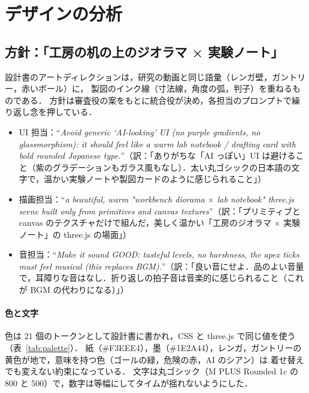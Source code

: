 \documentclass[a4paper,10pt]{ltjsarticle}
\newcommand{\tabref}[1]{表~\ref{#1}}
\begin{document}
\section{デザインの分析}
\label{sec:design}

\subsection{方針：「工房の机の上のジオラマ × 実験ノート」}
設計書のアートディレクションは，研究の動画と同じ語彙（レンガ壁，ガントリー，赤いボール）に，
製図のインク線（寸法線，角度の弧，判子）を重ねるものである．
方針は審査役の案をもとに統合役が決め，各担当のプロンプトで繰り返し念を押している．
\begin{itemize}
  \item UI 担当：``\textit{Avoid generic `AI-looking' UI (no purple gradients, no glassmorphism): it should feel like a warm lab notebook / drafting card with bold rounded Japanese type.}''（訳：「ありがちな「AI っぽい」UI は避けること（紫のグラデーションもガラス風もなし）．太い丸ゴシックの日本語の文字で，温かい実験ノートや製図カードのように感じられること」）
  \item 描画担当：``\textit{a beautiful, warm "workbench diorama $\times$ lab notebook" three.js scene built only from primitives and canvas textures}''（訳：「プリミティブと canvas のテクスチャだけで組んだ，美しく温かい「工房のジオラマ × 実験ノート」の three.js の場面」）
  \item 音担当：``\textit{Make it sound GOOD: tasteful levels, no harshness, the apex ticks must feel musical (this replaces BGM).}''（訳：「良い音にせよ．品のよい音量で，耳障りな音はなし．折り返しの拍子音は音楽的に感じられること（これが BGM の代わりになる）」）
\end{itemize}

\paragraph{色と文字} 色は 21 個のトークンとして設計書に書かれ，CSS と three.js で同じ値を使う（\tabref{tab:palette}）．
紙（\#F3EEE4），墨（\#1E2A44），レンガ，ガントリーの黄色が地で，意味を持つ色（ゴールの緑，危険の赤，AI のシアン）は
着せ替えでも変えない約束になっている．
文字は丸ゴシック（M PLUS Rounded 1c の 800 と 500）で，数字は等幅にしてタイムが揺れないようにした．
\end{document}
